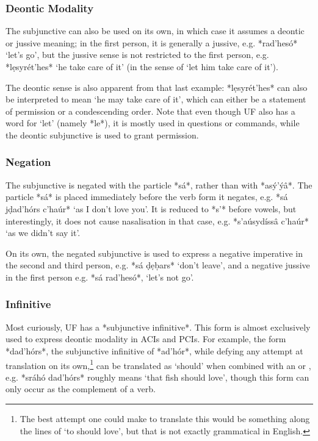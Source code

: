 \documentclass[a4paper, 12pt, oneside, final]{article}
\begin{document}
\subsubsection{Deontic Modality}
The subjunctive can also be used on its own, in which case it assumes a deontic or jussive meaning;
in the first person, it is generally a jussive, e.g. *rad’hesó* ‘let’s go’, but the jussive sense is not restricted
to the first person, e.g. *lẹsyrét’hes* ‘he take care of it’ (in the sense of ‘let him take care of it’).

The deontic sense is also apparent from that last example: *lẹsyrét’hes* can also be interpreted to mean ‘he
may take care of it’, which can either be a statement of permission or a condescending order. Note that even
though UF also has a word for ‘let’ (namely *le*), it is mostly used in questions or commands, while the
deontic subjunctive is used to grant permission.

\subsubsection{Negation}\label{subsubsec:negated-subjunctive}
The subjunctive is negated with the particle *sá*, rather than with *asý’ýâ*. The particle *sá* is placed
immediately before the verb form it negates, e.g. *sá jḍad’hórs c’haúr* ‘as I don’t love you’. It is reduced
to *s’* before vowels, but interestingly, it does not cause nasalisation in that case, e.g. *s’aúsydíssâ c’haúr*
‘as we didn’t say it’.

On its own, the negated subjunctive is used to express a negative imperative in the second and third person,
e.g. *sá ḍẹḅars* ‘don’t leave’, and a negative jussive in the first person e.g. *sá rad’hesó*, ‘let’s not go’.

\subsubsection{Infinitive}
Most curiously, UF has a *subjunctive infinitive*. This form is almost exclusively used to express deontic modality
in ACIs and PCIs. For example, the form *dad’hórs*, the subjunctive infinitive of *ad’hór*, while defying any attempt
at translation on its own,\footnote{The best attempt one could make to translate this would be something along the
lines of ‘to should love’, but that is not exactly grammatical in English.} can be translated as ‘should’ when combined
with an  or , e.g. *sráhó dad’hórs* roughly means ‘that fish should love’, though this form can only
occur as the complement of a verb.
\end{document}
